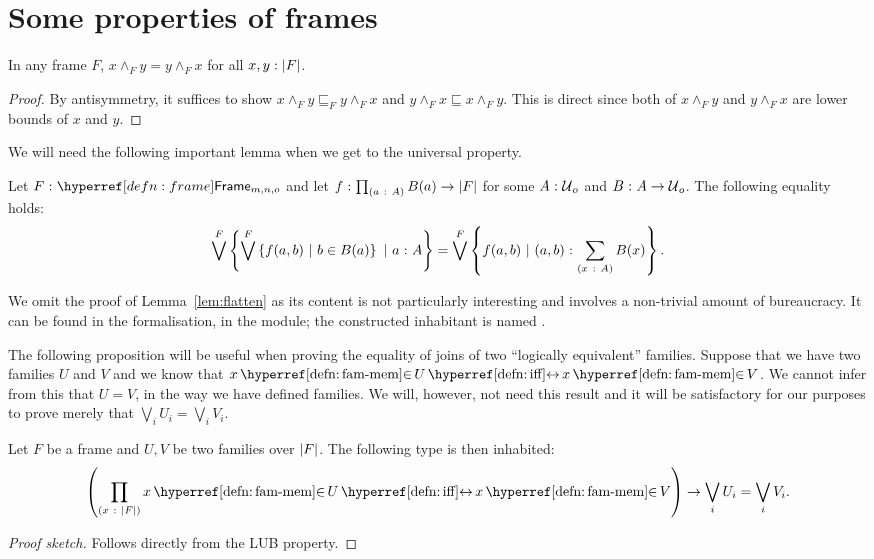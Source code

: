 \section{Some properties of frames}

\begin{prop}\label{prop:comm}
  In any frame $F$, $x \wedge_F y = y \wedge_F x$ for all $x, y:\left| F \right|$.
\end{prop}
\begin{proof}
  By antisymmetry, it suffices to show $x \wedge_F y \sqsubseteq_F y \wedge_F x$ and $y \wedge_F x \sqsubseteq x \wedge_F y$. This
  is direct since both of $x \wedge_F y$ and $y \wedge_F x$ are lower bounds of $x$ and $y$.
\end{proof}

We will need the following important lemma when we get to the universal property.
\begin{lemma}\label{lem:flatten}
  Let $\oftyI{F}{\framety{m}{n}{o}}$ and let $f\hspace{0.1mm}:\hspace{0.1mm}\prod_{(a~:~A)} B(a) \rightarrow \left| F \right|$ for
  some $A\hspace{0.1mm}:\hspace{0.1mm}\mathcal{U}{}_o$ and $B\hspace{0.1mm}:\hspace{0.1mm}A \rightarrow \mathcal{U}{}_o$. The following equality
  holds:
  \begin{equation*}
      \bigvee^F \left\{  \bigvee^F \left\{  f(a, b) ~|~ b \in B(a)  \right\} ~|~ a\hspace{0.1mm}:\hspace{0.1mm}A           \right\}
    = \bigvee^F \left\{  f(a, b)             ~|~ (a, b)\hspace{0.1mm}:\hspace{0.1mm}\sum_{(x~:~A)} B(x)  \right\}.
  \end{equation*}
\end{lemma}

We omit the proof of Lemma~\ref{lem:flatten} as its content is not particularly
interesting and involves a non-trivial amount of bureaucracy. It can be found in the
\veragda{} formalisation, in the  module; the constructed inhabitant is
named .

The following proposition will be useful when proving the equality of joins of two
``logically equivalent'' families. Suppose that we have two families $U$ and $V$ and we
know that $\logequiv{\memfam{x}{U}}{\memfam{x}{V}}$. We cannot infer from this that
$U = V$, in the way we have defined families. We will, however, not need this result and
it will be satisfactory for our purposes to prove merely that $\bigvee_i U_i = \bigvee_i V_i$.
\begin{prop}\label{prop:family-iff}
  Let $F$ be a frame and $U, V$ be two families over $\left| F \right|$. The following type is then
  inhabited:
  \begin{equation*}
    \left(\pity{x}{\abs{F}}{\logequiv{\memfam{x}{U}}{\memfam{x}{V}}}\right)
      \rightarrow \bigvee_i U_i = \bigvee_i V_i.
  \end{equation*}
\end{prop}
\begin{proof}[Proof sketch]
  Follows directly from the LUB property.
\end{proof}

